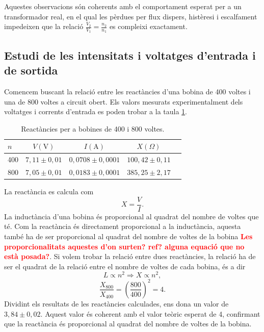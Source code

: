 \documentclass[a4paper,10.5pt]{report}
\begin{document}
Aquestes observacions són coherents amb el comportament esperat per a un transformador real, en el qual les pèrdues per flux dispers, histèresi i escalfament impedeixen que la relació \( \frac{V_2}{V_1} = \frac{n_2}{n_1} \) es compleixi exactament.

\subsection{Estudi de les intensitats i voltatges d'entrada i de sortida}
Comencem buscant la relació entre les reactàncies d'una bobina de 400 voltes i una de 800 voltes a circuit obert. Els valors mesurats experimentalment dels voltatges i corrents d'entrada es poden trobar a la taula \ref{tab:4.3}. 

\begin{table}[H]
	\centering
	\renewcommand{\arraystretch}{1.2}
	\caption{Reactàncies per a bobines de 400 i 800 voltes.}
	\begin{tabular}{lcccc}
		\toprule
		$n$ & $V (\text{V})$ & $I (\text{A})$ & $X(\Omega)$ \\
		\midrule
		400 & $7{,}11 \pm 0{,}01$ & $0{,}0708 \pm 0{,}0001$ & $100{,}42 \pm 0{,}11$ \\
		800 & $7{,}05 \pm 0{,}01$ & $0{,}0183 \pm 0{,}0001$ & $385{,}25 \pm 2{,}17$ \\
		\bottomrule
	\end{tabular}
	\label{tab:4.3}
\end{table}
La reactància es calcula com
\begin{equation}
	X = \frac{V}{I}.
\end{equation}
La inductància d'una bobina és proporcional al quadrat del nombre de voltes que té. Com la reactància és directament proporcional a la inductància, aquesta també ha de ser proporcional al quadrat del nombre de voltes de la bobina \textcolor{red}{\textbf{Les proporcionalitats aquestes d'on surten? ref? alguna equació que no està posada?}}. Si volem trobar la relació entre dues reactàncies, la relació ha de ser el quadrat de la relació entre el nombre de voltes de cada bobina, és a dir
\begin{equation}
	L \propto n^2 \Rightarrow X \propto n^2, 
\end{equation}
\begin{equation}
	\frac{X_{800}}{X_{400}} = \left( \frac{800}{400} \right)^2 = 4. \label{eq:4.30}
\end{equation}
Dividint els resultats de les reactàncies calculades, ens dona un valor de $ 3,84 \pm 0,02 $. 
Aquest valor és coherent amb el valor teòric esperat de 4, confirmant que la reactància és proporcional al quadrat del nombre de voltes de la bobina. 
\end{document}
